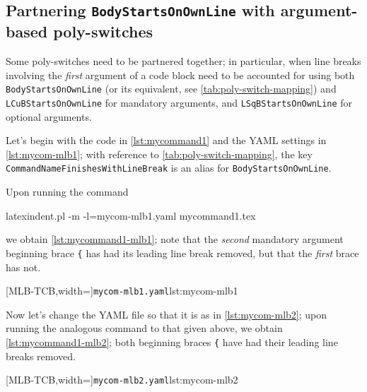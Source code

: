 \subsection{Partnering \texttt{BodyStartsOnOwnLine} with argument-based poly-switches}
Some poly-switches need to be partnered together; in particular, when line breaks involving the \emph{first} argument 
of a code block need to be accounted for using both \texttt{BodyStartsOnOwnLine} (or its equivalent, see \vref{tab:poly-switch-mapping})
and \texttt{LCuBStartsOnOwnLine} for mandatory arguments, and \texttt{LSqBStartsOnOwnLine} for optional arguments.

Let's begin with the code in \cref{lst:mycommand1} and the YAML settings in \cref{lst:mycom-mlb1}; with reference
to \vref{tab:poly-switch-mapping}, the key \texttt{CommandNameFinishesWithLineBreak} is an alias for \texttt{BodyStartsOnOwnLine}.


Upon running the command
\begin{commandshell}
latexindent.pl -m -l=mycom-mlb1.yaml mycommand1.tex
\end{commandshell}
we obtain \cref{lst:mycommand1-mlb1}; note that the \emph{second} mandatory argument beginning brace \lstinline!{! has had 
its leading line break removed, but that the \emph{first} brace has not.

	\begin{minipage}{.4\linewidth}
	\end{minipage}
    \hfill
	\begin{minipage}{.55\linewidth}
		[MLB-TCB,width=\linewidth]{\texttt{mycom-mlb1.yaml}}{lst:mycom-mlb1}
	\end{minipage}

    Now let's change the YAML file so that it is as in \cref{lst:mycom-mlb2}; upon running the analogous command to that given above, 
    we obtain \cref{lst:mycommand1-mlb2}; both beginning braces \lstinline!{! have had their leading line breaks removed.

	\begin{minipage}{.4\linewidth}
	\end{minipage}
    \hfill
	\begin{minipage}{.55\linewidth}
		[MLB-TCB,width=\linewidth]{\texttt{mycom-mlb2.yaml}}{lst:mycom-mlb2}
	\end{minipage}

